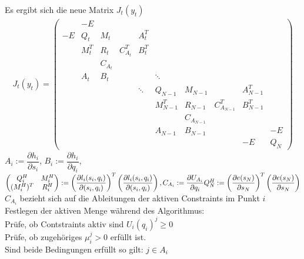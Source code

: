 \documentclass[12pt,a4paper]{article}
\begin{document}
  Es ergibt sich die neue Matrix $J_t(y_t)$
  \begin{align*}
  J_t(y_t) = 
  \begin{pmatrix}
    & -E &   &   &  &  &   &   &  &    \\
  -E& Q_t & M_t  &  & A_t^{T} &  &  &   &    &       \\
    & M_t^T & R_t & C_{A_t}^T &   B_t^{T} &  & &  &   &      \\
    &       & C_{A_t} &         &  &   & &  &    \\
    & A_t & B_t &  &   & \ddots &   & &  &    \\
    &  &  &   & \ddots & Q_{N-1} & M_{N-1} &  & A_{N-1}^{T}  &     \\
    &  &  &  &      & M_{N-1}^T  & R_{N-1} & C_{A_{N-1}}^T & B_{N-1}^{T}  &     \\
    &  &  &  &      &            & C_{A_{N-1}}  & &              &    \\
    &  &  &  &      & A_{N-1} & B_{N-1}  & &    & -E \\
    &  &  &  & &  & &  & -E & Q_{N}
  \end{pmatrix}
  \end{align*}
  $ A_i := \dfrac{\partial h_i}{\partial s_i} $, 
  $ B_i := \dfrac{\partial h_i}{\partial q_i} $,
  $
  \begin{pmatrix}
  Q_i^{H} & M_i^{H} \\
  (M_i^{H})^{T} & R_i^{H}
  \end{pmatrix} :=
  \left( 
  \dfrac{\partial l_i (s_i,q_i)}{\partial (s_i,q_i)}
  \right) ^{T}
  \left( 
  \dfrac{\partial l_i (s_i,q_i)}{\partial (s_i,q_i)}
  \right)
  , C_{A_i} := \dfrac{\partial U_{A_i}}{\partial q_i} \ \\
  Q_N^{H} :=
  \left( 
  \dfrac{\partial e (s_N)}{\partial s_N}
  \right) ^{T}
  \left( 
  \dfrac{\partial e (s_N)}{\partial s_N}
  \right)
  $ \\
  $C_{A_i}$ bezieht sich auf die Ableitungen der aktiven Constraints im Punkt $ i $
  \newpage
  Festlegen der aktiven Menge während des Algorithmus: \\
  Prüfe, ob Contstraints aktiv sind $ U_i(q_i)^j \geq 0 $ \\
  Prüfe, ob zugehöriges $ \mu_i^j > 0 $ erfüllt ist. \\
  Sind beide Bedingungen erfüllt so gilt: $ j\in A_i $ \\
  
\end{document}
